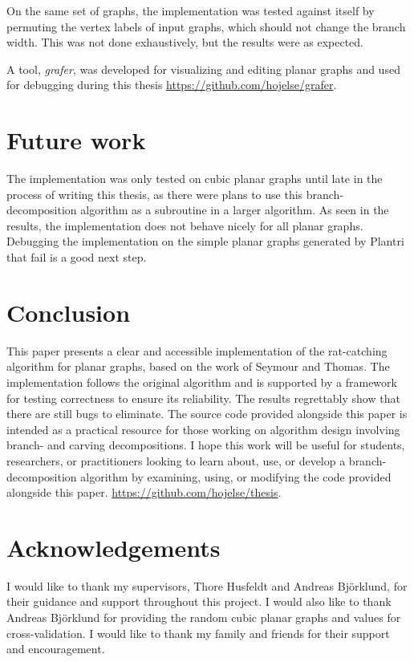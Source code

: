 \documentclass{article}
\begin{document}
	On the same set of graphs, the implementation was tested against itself by permuting the vertex labels of input graphs, which should not change the branch width. This was not done exhaustively, but the results were as expected.

	A tool, \textit{grafer}, was developed for visualizing and editing planar graphs and used for debugging during this thesis \url{https://github.com/hojelse/grafer}.

\section{Future work}
	The implementation was only tested on cubic planar graphs until late in the process of writing this thesis, as there were plans to use this branch-decomposition algorithm as a subroutine in a larger algorithm. As seen in the results, the implementation does not behave nicely for all planar graphs. Debugging the implementation on the simple planar graphs generated by Plantri that fail is a good next step.

\section{Conclusion}
	This paper presents a clear and accessible implementation of the rat-catching algorithm for planar graphs, based on the work of Seymour and Thomas. The implementation follows the original algorithm and is supported by a framework for testing correctness to ensure its reliability. The results regrettably show that there are still bugs to eliminate. The source code provided alongside this paper is intended as a practical resource for those working on algorithm design involving branch- and carving decompositions. I hope this work will be useful for students, researchers, or practitioners looking to learn about, use, or develop a branch-decomposition algorithm by examining, using, or modifying the code provided alongside this paper. \url{https://github.com/hojelse/thesis}.

\section{Acknowledgements}
	I would like to thank my supervisors, Thore Husfeldt and Andreas Björklund, for their guidance and support throughout this project. I would also like to thank Andreas Björklund for providing the random cubic planar graphs and values for cross-validation. I would like to thank my family and friends for their support and encouragement.
\end{document}
